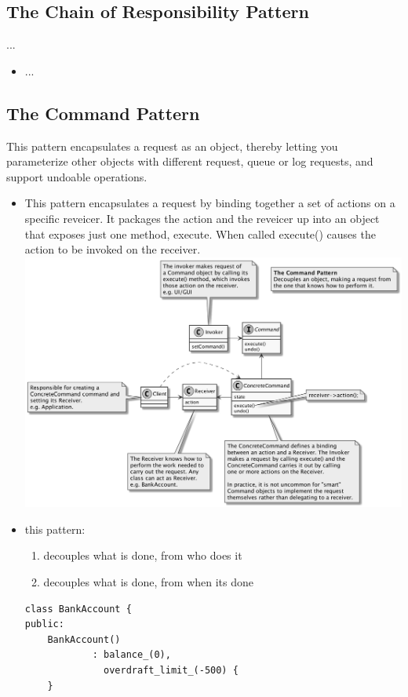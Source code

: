 \documentclass[11pt]{article}
\begin{document}
    \subsection{The Chain of Responsibility Pattern}
    ...
    \begin{itemize}
        \item ...
    \end{itemize}

    \subsection{The Command Pattern}
    This pattern encapsulates a request as an object, thereby letting you parameterize other objects with different
    request, queue or log requests, and support undoable operations.
    \begin{itemize}
        \item This pattern encapsulates a request by binding together a set of actions on a specific reveicer. It packages
        the action and the reveicer up into an object that exposes just one method, execute. When called execute()
        causes the action to be invoked on the receiver.\\
        \includegraphics[scale=0.15]{command/1__command}
        \item this pattern:
        \begin{enumerate}
            \item decouples what is done, from who does it
            \item decouples what is done, from when its done
        \end{enumerate}
        \begin{multicols}{2}
            \begin{lstlisting}
class BankAccount {
public:
    BankAccount()
            : balance_(0),
              overdraft_limit_(-500) {
    }


\end{lstlisting}
\end{multicols}
\end{itemize}
\end{document}
